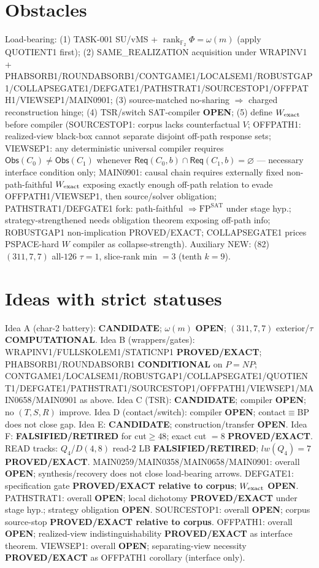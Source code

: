 \documentclass[11pt]{article}
\begin{document}
\section*{Obstacles}
Load-bearing: (1) TASK-001 SU/vMS + $\operatorname{rank}_{\mathbb F_2}\Phi=\omega(m)$ (apply QUOTIENT1 first);
(2) SAME\_REALIZATION acquisition under WRAPINV1 + PHABSORB1/ROUNDABSORB1/CONTGAME1/LOCALSEM1/ROBUSTGAP1/COLLAPSEGATE1/DEFGATE1/PATHSTRAT1/SOURCESTOP1/OFFPATH1/VIEWSEP1/MAIN0901;
(3) source-matched no-sharing $\Rightarrow$ charged reconstruction hinge;
(4) TSR/switch SAT-compiler \textbf{OPEN};
(5) define $W_{\rm exact}$ before compiler (SOURCESTOP1: corpus lacks counterfactual $V$;
OFFPATH1: realized-view black-box cannot separate disjoint off-path response sets;
VIEWSEP1: any deterministic universal compiler requires $\mathsf{Obs}(C_0)\ne\mathsf{Obs}(C_1)$
whenever $\mathsf{Req}(C_0,b)\cap\mathsf{Req}(C_1,b)=\varnothing$ --- necessary interface condition only;
MAIN0901: causal chain requires externally fixed non-path-faithful $W_{\rm exact}$ exposing
exactly enough off-path relation to evade OFFPATH1/VIEWSEP1, then source/solver obligation;
PATHSTRAT1/DEFGATE1 fork: path-faithful $\Rightarrow\mathrm{FP}^{\mathrm{SAT}}$ under stage hyp.;
strategy-strengthened needs obligation theorem exposing off-path info;
ROBUSTGAP1 non-implication PROVED/EXACT; COLLAPSEGATE1 prices PSPACE-hard $W$ compiler as collapse-strength).
Auxiliary NEW: (82) $(311,7,7)$ all-$126$ $\tau{=}1$, slice-rank min $=3$ (tenth $k{=}9$).

\section*{Ideas with strict statuses}
Idea A (char-2 battery): \textbf{CANDIDATE}; $\omega(m)$ \textbf{OPEN}; $(311,7,7)$ exterior/$\tau$ \textbf{COMPUTATIONAL}.
Idea B (wrappers/gates): WRAPINV1/FULLSKOLEM1/STATICNP1 \textbf{PROVED/EXACT};
PHABSORB1/ROUNDABSORB1 \textbf{CONDITIONAL} on $P=NP$;
CONTGAME1/LOCALSEM1/ROBUSTGAP1/COLLAPSEGATE1/QUOTIENT1/DEFGATE1/PATHSTRAT1/SOURCESTOP1/OFFPATH1/VIEWSEP1/MAIN0658/MAIN0901 as above.
Idea C (TSR): \textbf{CANDIDATE}; compiler \textbf{OPEN}; no $(T,S,R)$ improve.
Idea D (contact/switch): compiler \textbf{OPEN}; contact$\equiv$BP does not close gap.
Idea E: \textbf{CANDIDATE}; construction/transfer \textbf{OPEN}.
Idea F: \textbf{FALSIFIED/RETIRED} for cut$\ge48$; exact cut $=8$ \textbf{PROVED/EXACT}.
READ tracks: $Q_4$/$D(4,8)$ read-$2$ LB \textbf{FALSIFIED/RETIRED}; $lw(Q_4)=7$ \textbf{PROVED/EXACT}.
MAIN0259/MAIN0358/MAIN0658/MAIN0901: overall \textbf{OPEN}; synthesis/recovery does not close load-bearing arrows.
DEFGATE1: specification gate \textbf{PROVED/EXACT relative to corpus}; $W_{\rm exact}$ \textbf{OPEN}.
PATHSTRAT1: overall \textbf{OPEN}; local dichotomy \textbf{PROVED/EXACT} under stage hyp.; strategy obligation \textbf{OPEN}.
SOURCESTOP1: overall \textbf{OPEN}; corpus source-stop \textbf{PROVED/EXACT relative to corpus}.
OFFPATH1: overall \textbf{OPEN}; realized-view indistinguishability \textbf{PROVED/EXACT} as interface theorem.
VIEWSEP1: overall \textbf{OPEN}; separating-view necessity \textbf{PROVED/EXACT} as OFFPATH1 corollary (interface only).
\end{document}
